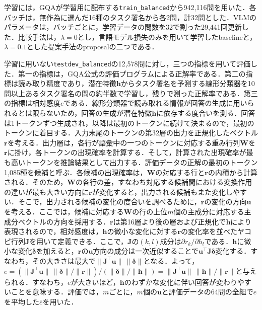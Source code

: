 \documentclass[10pt,dvipdfmx]{jarticle}
\begin{document}
学習には，GQAが学習用に配布する\texttt{train\_balanced}から942,116問を用いた．各バッチは，無作為に選んだ16種のタスク署名から各2問，計32問とした．VLMのパラメータは，バッチごとに，学習データの問数を32で割った29,441回更新した．比較手法は，$\lambda = 0$とし，言語モデル損失のみを用いて学習したbaselineと，$\lambda = 0.1$とした提案手法のproposalの二つである．

学習に用いない\texttt{testdev\_balanced}の12,578問に対し，三つの指標を用いて評価した．第一の指標は，GQA公式の評価プログラムによる正解率である．第二の指標は読み取り精度であり，潜在特徴$\boldsymbol{h}$からタスク署名を予測する線形分類器を10問以上あるタスク署名の問の約半数で学習し，残りで測った正解率である．第三の指標は相対感度$e$である．線形分類器で読み取れる情報が回答の生成に用いられるとは限らない\cite{elazar}ため，回答の生成が潜在特徴$\boldsymbol{h}$に依存する度合いを測る．回答は1トークンずつ生成され，以降は最初のトークンに続けて決まるので，最初のトークンに着目する．入力末尾のトークンの第32層の出力を正規化したベクトル$\boldsymbol{r}$を考える．出力層は，各行が語彙中の一つのトークンに対応する重み行列$\boldsymbol{W}$を$\boldsymbol{r}$に掛け，各トークンの出現確率を計算する．そして，計算された出現確率が最も高いトークンを推論結果として出力する．評価データの正解の最初のトークン1,085種を候補と呼ぶ．各候補の出現確率は，$\boldsymbol{W}$の対応する行と$\boldsymbol{r}$の内積から計算される．そのため，$\boldsymbol{W}$の各行の差，すなわち対応する候補間における変換作用の違いが最も大きい方向に$\boldsymbol{r}$が変化すると，出力される候補もまた変化しやすい．そこで，出力される候補の変化の度合いを調べるために，$\boldsymbol{r}$の変化の方向$\boldsymbol{u}$を考える．ここでは，候補に対応する$\boldsymbol{W}$の行の上位$m$個の主成分に対応する主成分ベクトルの方向を採用する．$\boldsymbol{r}$は第16層より後の層および正規化で$\boldsymbol{h}$により表現されるので，相対感度は，$\boldsymbol{h}$の微小な変化に対する$\boldsymbol{r}$の変化率を並べたヤコビ行列$\boldsymbol{J}$を用いて定義できる．ここで，$\boldsymbol{J}$の$(k, l)$成分は$\partial r_k / \partial h_l$である．$\boldsymbol{h}$に微小な変化$\boldsymbol{\delta}$を加えると，$\boldsymbol{r}$の$\boldsymbol{u}$方向の成分は一次近似することで$\boldsymbol{u}^{\top} \boldsymbol{J} \boldsymbol{\delta}$変化する．すなわち，その大きさは最大で$\| \boldsymbol{J}^{\top} \boldsymbol{u} \| \, \| \boldsymbol{\delta} \|$となる．よって，$e = (\| \boldsymbol{J}^{\top} \boldsymbol{u} \| \, \| \boldsymbol{\delta} \| / \| \boldsymbol{r} \|) / (\| \boldsymbol{\delta} \| / \| \boldsymbol{h} \|) = \| \boldsymbol{J}^{\top} \boldsymbol{u} \| \, \| \boldsymbol{h} \| / \| \boldsymbol{r} \|$と与えられる．すなわち，$e$が大きいほど，$\boldsymbol{h}$のわずかな変化に伴い回答が変わりやすいことを意味する．評価では，$m$ごとに，$m$個の$\boldsymbol{u}$と評価データの64問の全組で$e$を平均した$\overline{e}$を用いた．
\end{document}

